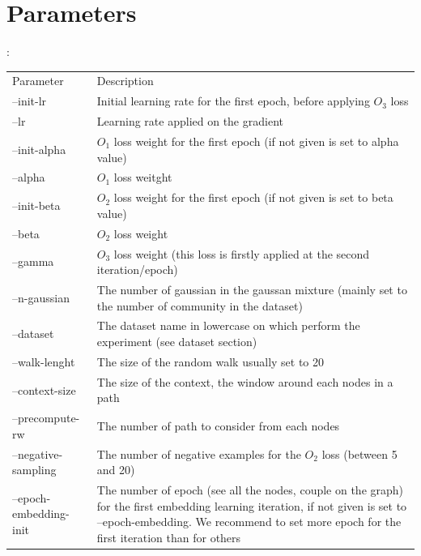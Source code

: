 \documentclass{article}
\begin{document}
    \section{Parameters}:
        \begin{table}
            \centering
            \begin{tabular}{l|p{10cm}}
                \hline
                Parameter & Description \\
                --init-lr & Initial learning rate for the first epoch, before applying $O_3$ loss \\
                --lr & Learning rate applied on the gradient \\
                --init-alpha & $O_1$ loss weight for the first epoch (if not given is set to alpha value) \\
                --alpha & $O_1$ loss weitght \\
                --init-beta & $O_2$ loss weight for the first epoch (if not given is set to beta value) \\
                --beta & $O_2$ loss weight \\
                \hline
                \hline
                --gamma & $O_3$ loss weight (this loss is firstly applied at the second iteration/epoch) \\
                --n-gaussian & The number of gaussian in the gaussan mixture (mainly set to the number of community in the dataset) \\
                \hline
                --dataset & The dataset name in lowercase on which perform the experiment (see dataset section) \\
                \hline
                \hline
                --walk-lenght & The size of the random walk usually set to 20 \\
                --context-size & The size of the context, the window around each nodes in a path \\
                --precompute-rw & The number of path to consider from each nodes \\
                \hline
                \hline
                --negative-sampling & The number of negative examples for the $O_2$ loss (between 5 and 20) \\
                \hline
                \hline
                --epoch-embedding-init & The number of epoch (see all the nodes, couple on the graph) for the first embedding learning iteration, if not given is set to --epoch-embedding. We recommend to set more epoch for the first iteration than for others \\

\end{tabular}
\end{table}
\end{document}
